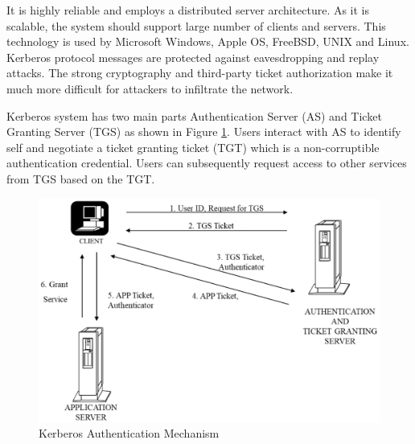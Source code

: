\begin{multicols}{2}
It is highly reliable and employs a distributed server architecture. As it is scalable, the system should support large number of clients and servers. This technology is used by Microsoft Windows, Apple OS, FreeBSD, UNIX and Linux. Kerberos protocol messages are protected against eavesdropping and replay attacks. The strong cryptography and third-party ticket authorization make it much more difficult for attackers to infiltrate the network.

Kerberos system has two main parts Authentication Server (AS) and Ticket Granting Server (TGS) as shown in Figure \ref{chap2-fig3}. Users interact with AS to identify self and negotiate a ticket granting ticket (TGT) which is a non-corruptible authentication credential. Users can subsequently request access to other services from TGS based on the TGT.
\end{multicols}

\begin{figure}[!ht]
\centering
\includegraphics[scale=.82]{src/Figures/chap2/3.eps}
\caption{Kerberos Authentication Mechanism}\label{chap2-fig3}
\end{figure}

